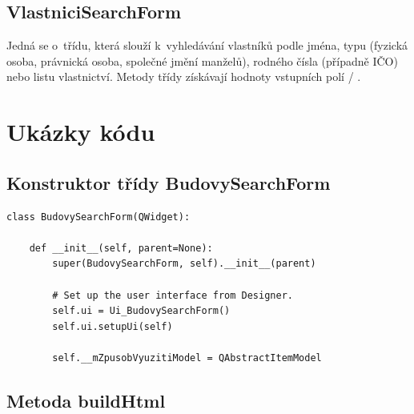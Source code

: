 \documentclass[a4paper,12pt,oneside]{book}
\begin{document}
\section{VlastniciSearchForm}
Jedná se o~třídu, která slouží k~vyhledávání vlastníků podle jména,
typu (fyzická osoba, právnická osoba, společné jmění manželů), rodného
čísla (případně IČO) nebo listu vlastnictví. Metody třídy získávají
hodnoty vstupních polí / .



\chapter{Ukázky kódu}

\section{Konstruktor třídy BudovySearchForm}

{\scriptsize
\begin{lstlisting}[style=python, label=l_budovySearchForm_konstruktor]
class BudovySearchForm(QWidget):

    def __init__(self, parent=None):
        super(BudovySearchForm, self).__init__(parent)

        # Set up the user interface from Designer.
        self.ui = Ui_BudovySearchForm()
        self.ui.setupUi(self)

        self.__mZpusobVyuzitiModel = QAbstractItemModel
\end{lstlisting}
}

\section{Metoda buildHtml}
\end{document}
